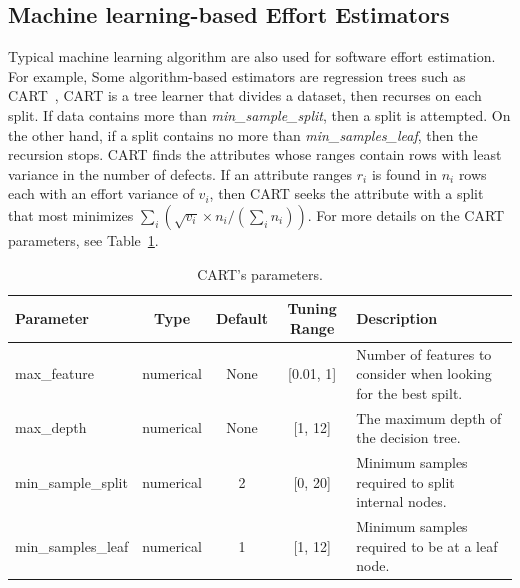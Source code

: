 \documentclass[sigconf,review]{acmart}
\begin{document}
\subsection{Machine learning-based Effort Estimators}
\label{sec:algo}


\newcommand{\centered}[1]{\begin{tabular}{l} #1 \end{tabular}}



Typical machine learning algorithm are also used for software effort estimation. For example, Some algorithm-based estimators are regression trees such as CART~\cite{brieman84}, 
CART is a  tree learner that divides a dataset, then recurses
on each split.
If data contains more than {\em min\_sample\_split}, then a split is attempted.
On the other hand, if a split contains no more than {\em min\_samples\_leaf}, then the recursion stops. 
CART finds the attributes whose ranges contain rows with least variance in the number
of defects. If an  attribute ranges $r_i$ is found in 
$n_i$ rows each with an effort  variance of $v_i$, then CART seeks the  attribute with a split that most
minimizes $\sum_i \left(\sqrt{v_i}\times n_i/(\sum_i n_i)\right)$.
For more details on the CART parameters, see Table~\ref{tbl:cart}.

\begin{table}[!t]
\centering
\caption{CART's parameters.}\label{tbl:cart}
\begin{tabular}{l|c|c|c|p{1.6in}}
\hline \rowcolor{black!30}
Parameter  &Type        & Default & Tuning Range  & Description     \\\hline
max\_feature & numerical      & None    & {[}0.01, 1{]} &Number of features to consider when looking for the best spilt. \\
\rowcolor{black!15} max\_depth  &numerical       & None    & {[}1, 12{]}   & The maximum depth of the decision tree.                                     \\
min\_sample\_split & numerical & 2       & {[}0, 20{]}   & Minimum   samples required to split  internal nodes.  \\
\rowcolor{black!15} min\_samples\_leaf & numerical& 1       & {[}1, 12{]}   &   Minimum   samples required to be at a leaf node.    \\\hline

\end{tabular}
\end{table}
\end{document}
